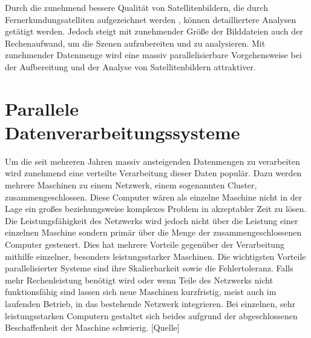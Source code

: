  
Durch die zunehmend bessere Qualität von Satellitenbildern, die durch Fernerkundungsatelliten aufgezeichnet werden \cite{Markham2004}, können detailliertere Analysen getätigt werden. Jedoch steigt mit zunehmender Größe der Bilddateien auch der Rechenaufwand, um die Szenen aufzubereiten und zu analysieren. Mit zunehmender Datenmenge wird eine massiv parallelisierbare Vorgehensweise bei der Aufbereitung und der Analyse von Satellitenbildern attraktiver.

\section{Parallele Datenverarbeitungssysteme}
Um die seit mehreren Jahren massiv ansteigenden Datenmengen \cite{EMC2014} zu verarbeiten wird zunehmend eine verteilte Verarbeitung dieser Daten populär. Dazu werden mehrere Maschinen zu einem Netzwerk, einem sogenannten Cluster, zusammengeschlossen. Diese Computer wären als einzelne Maschine nicht in der Lage ein großes beziehungsweise komplexes Problem in akzeptabler Zeit zu lösen. Die Leistungsfähigkeit des Netzwerks wird jedoch nicht über die Leistung einer einzelnen Maschine sondern primär über die Menge der zusammengeschlossenen Computer gesteuert. Dies hat mehrere Vorteile gegenüber der Verarbeitung mithilfe einzelner, besonders leistungsstarker Maschinen. Die wichtigsten Vorteile parallelisierter Systeme sind ihre Skalierbarkeit sowie die Fehlertoleranz. Falls mehr Rechenleistung benötigt wird oder wenn Teile des Netzwerks nicht funktionsfähig sind lassen sich neue Maschinen kurzfristig, meist auch im laufenden Betrieb, in das bestehende Netzwerk integrieren. Bei einzelnen, sehr leistungsstarken Computern gestaltet sich beides aufgrund der abgeschlossenen Beschaffenheit der Maschine schwierig. [Quelle]

